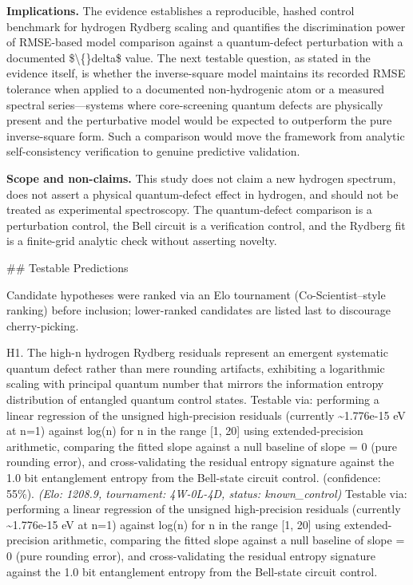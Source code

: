 \documentclass[11pt,a4paper]{article}
\begin{document}
\textbf{Implications.} The evidence establishes a reproducible, hashed control benchmark for hydrogen Rydberg scaling and quantifies the discrimination power of RMSE-based model comparison against a quantum-defect perturbation with a documented \$\textbackslash\{\}delta\$ value. The next testable question, as stated in the evidence itself, is whether the inverse-square model maintains its recorded RMSE tolerance when applied to a documented non-hydrogenic atom or a measured spectral series—systems where core-screening quantum defects are physically present and the perturbative model would be expected to outperform the pure inverse-square form. Such a comparison would move the framework from analytic self-consistency verification to genuine predictive validation.

\textbf{Scope and non-claims.} This study does not claim a new hydrogen spectrum, does not assert a physical quantum-defect effect in hydrogen, and should not be treated as experimental spectroscopy. The quantum-defect comparison is a perturbation control, the Bell circuit is a verification control, and the Rydberg fit is a finite-grid analytic check without asserting novelty.

\#\# Testable Predictions

Candidate hypotheses were ranked via an Elo tournament (Co-Scientist–style ranking) before inclusion; lower-ranked candidates are listed last to discourage cherry-picking.

H1. The high-n hydrogen Rydberg residuals represent an emergent systematic quantum defect rather than mere rounding artifacts, exhibiting a logarithmic scaling with principal quantum number that mirrors the information entropy distribution of entangled quantum control states. Testable via: performing a linear regression of the unsigned high-precision residuals (currently \textasciitilde{}1.776e-15 eV at n=1) against log(n) for n in the range [1, 20] using extended-precision arithmetic, comparing the fitted slope against a null baseline of slope = 0 (pure rounding error), and cross-validating the residual entropy signature against the 1.0 bit entanglement entropy from the Bell-state circuit control. (confidence: 55\%). \textit{(Elo: 1208.9, tournament: 4W-0L-4D, status: known\_control)} Testable via: performing a linear regression of the unsigned high-precision residuals (currently \textasciitilde{}1.776e-15 eV at n=1) against log(n) for n in the range [1, 20] using extended-precision arithmetic, comparing the fitted slope against a null baseline of slope = 0 (pure rounding error), and cross-validating the residual entropy signature against the 1.0 bit entanglement entropy from the Bell-state circuit control.
\end{document}

